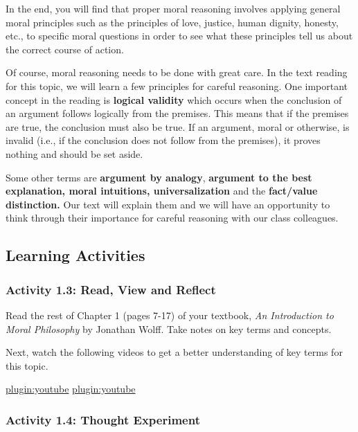 \documentclass[
]{book}
\begin{document}
In the end, you will find that proper moral reasoning involves applying general
moral principles such as the principles of love, justice, human dignity,
honesty, etc., to specific moral questions in order to see what these principles
tell us about the correct course of action.

Of course, moral reasoning needs to be done with great care. In the text reading
for this topic, we will learn a few principles for careful reasoning. One
important concept in the reading is \textbf{logical validity} which occurs when the
conclusion of an argument follows logically from the premises. This means that
if the premises are true, the conclusion must also be true. If an argument,
moral or otherwise, is invalid (i.e., if the conclusion does not follow from the
premises), it proves nothing and should be set aside.

Some other terms are \textbf{argument by analogy}, \textbf{argument to the best
explanation, moral intuitions, universalization} and the \textbf{fact/value
distinction.} Our text will explain them and we will have an opportunity to
think through their importance for careful reasoning with our class colleagues.

\hypertarget{learning-activities-2}{%
\subsection{Learning Activities}\label{learning-activities-2}}

\hypertarget{activity-1.3-read-view-and-reflect}{%
\subsubsection{Activity 1.3: Read, View and Reflect}\label{activity-1.3-read-view-and-reflect}}

Read the rest of Chapter 1 (pages 7-17) of your textbook, \emph{An Introduction to
Moral Philosophy} by Jonathan Wolff. Take notes on key terms and concepts.

Next, watch the following videos to get a better understanding of key terms for
this topic.

\href{https://www.youtube.com/watch?v=h_sufC5nY18}{plugin:youtube}
\href{https://www.youtube.com/watch?v=NKEhdsnKKHs}{plugin:youtube}

\hypertarget{activity-1.4-thought-experiment-1}{%
\subsubsection{Activity 1.4: Thought Experiment}\label{activity-1.4-thought-experiment-1}}
\end{document}
